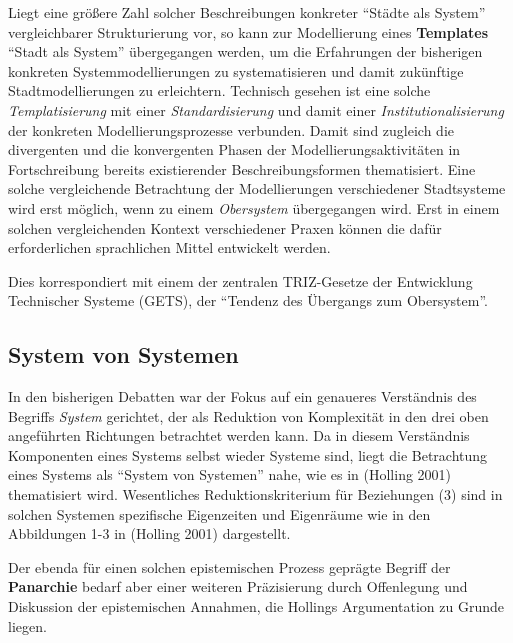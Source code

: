 \documentclass[11pt,a4paper]{article}
\begin{document}
Liegt eine größere Zahl solcher Beschreibungen konkreter ``Städte als
System'' vergleichbarer Strukturierung vor, so kann zur Modellierung
eines \textbf{Templates} ``Stadt als System'' übergegangen werden, um
die Erfahrungen der bisherigen konkreten Systemmodellierungen zu
systematisieren und damit zukünftige Stadtmodellierungen zu erleichtern.
Technisch gesehen ist eine solche \emph{Templatisierung} mit einer
\emph{Standardisierung} und damit einer \emph{Institutionalisierung} der
konkreten Modellierungsprozesse verbunden. Damit sind zugleich die
divergenten und die konvergenten Phasen der Modellierungsaktivitäten in
Fortschreibung bereits existierender Beschreibungsformen thematisiert.
Eine solche vergleichende Betrachtung der Modellierungen verschiedener
Stadtsysteme wird erst möglich, wenn zu einem \emph{Obersystem}
übergegangen wird. Erst in einem solchen vergleichenden Kontext
verschiedener Praxen können die dafür erforderlichen sprachlichen Mittel
entwickelt werden.

Dies korrespondiert mit einem der zentralen TRIZ-Gesetze der Entwicklung
Technischer Systeme (GETS), der ``Tendenz des Übergangs zum
Obersystem''.

\hypertarget{system-von-systemen}{%
\subsection{System von Systemen}\label{system-von-systemen}}

In den bisherigen Debatten war der Fokus auf ein genaueres Verständnis
des Begriffs \emph{System} gerichtet, der als Reduktion von Komplexität
in den drei oben angeführten Richtungen betrachtet werden kann. Da in
diesem Verständnis Komponenten eines Systems selbst wieder Systeme sind,
liegt die Betrachtung eines Systems als ``System von Systemen'' nahe,
wie es in (Holling 2001) thematisiert wird. Wesentliches
Reduktionskriterium für Beziehungen (3) sind in solchen Systemen
spezifische Eigenzeiten und Eigenräume wie in den Abbildungen 1-3 in
(Holling 2001) dargestellt.

Der ebenda für einen solchen epistemischen Prozess geprägte Begriff der
\textbf{Panarchie} bedarf aber einer weiteren Präzisierung durch
Offenlegung und Diskussion der epistemischen Annahmen, die Hollings
Argumentation zu Grunde liegen.
\end{document}
